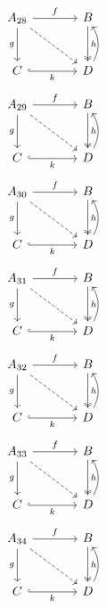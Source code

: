 \documentclass{article}
\begin{document}
\begin{equation}\begin{tikzcd}[column sep=large,row sep=large]
A_{28} \arrow[r,"f"] \arrow[d,"g"'] \arrow[dr,dashed] & B \arrow[d,two heads,"h"] \\ C \arrow[r,"k"',hook] & D \arrow[u,bend right]
\end{tikzcd}\end{equation}
\begin{equation}\begin{tikzcd}[column sep=large,row sep=large]
A_{29} \arrow[r,"f"] \arrow[d,"g"'] \arrow[dr,dashed] & B \arrow[d,two heads,"h"] \\ C \arrow[r,"k"',hook] & D \arrow[u,bend right]
\end{tikzcd}\end{equation}
\begin{equation}\begin{tikzcd}[column sep=large,row sep=large]
A_{30} \arrow[r,"f"] \arrow[d,"g"'] \arrow[dr,dashed] & B \arrow[d,two heads,"h"] \\ C \arrow[r,"k"',hook] & D \arrow[u,bend right]
\end{tikzcd}\end{equation}
\begin{equation}\begin{tikzcd}[column sep=large,row sep=large]
A_{31} \arrow[r,"f"] \arrow[d,"g"'] \arrow[dr,dashed] & B \arrow[d,two heads,"h"] \\ C \arrow[r,"k"',hook] & D \arrow[u,bend right]
\end{tikzcd}\end{equation}
\begin{equation}\begin{tikzcd}[column sep=large,row sep=large]
A_{32} \arrow[r,"f"] \arrow[d,"g"'] \arrow[dr,dashed] & B \arrow[d,two heads,"h"] \\ C \arrow[r,"k"',hook] & D \arrow[u,bend right]
\end{tikzcd}\end{equation}
\begin{equation}\begin{tikzcd}[column sep=large,row sep=large]
A_{33} \arrow[r,"f"] \arrow[d,"g"'] \arrow[dr,dashed] & B \arrow[d,two heads,"h"] \\ C \arrow[r,"k"',hook] & D \arrow[u,bend right]
\end{tikzcd}\end{equation}
\begin{equation}\begin{tikzcd}[column sep=large,row sep=large]
A_{34} \arrow[r,"f"] \arrow[d,"g"'] \arrow[dr,dashed] & B \arrow[d,two heads,"h"] \\ C \arrow[r,"k"',hook] & D \arrow[u,bend right]
\end{tikzcd}\end{equation}
\end{document}
